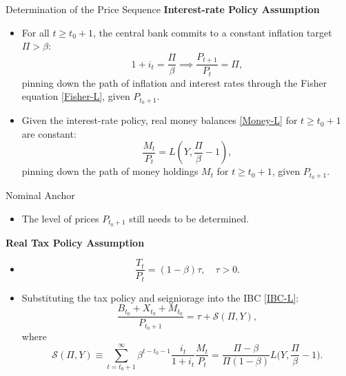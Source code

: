 \documentclass[11pt,aspectratio=169]{beamer}
\begin{document}
\begin{frame}{Determination of the Price Sequence}
\small
\textbf{Interest-rate Policy Assumption}
\begin{itemize}
    \item For all $t \ge t_0+1$, the central bank  commits to a constant inflation target $\Pi > \beta$:
    \begin{equation*}
        1+i_t = \frac{\Pi}{\beta} \implies \frac{P_{t+1}}{P_t} = \Pi,
    \end{equation*}
    pinning down the path of inflation and interest rates through the Fisher equation \eqref{Fisher-L}, given $P_{t_{0}+1}$.
    
    \item Given the interest-rate policy, real money balances \eqref{Money-L} for $t \ge t_0+1$ are constant:
    \begin{equation*}
        \frac{M_t}{P_t} = L\!\left(Y,\frac{\Pi}{\beta}-1\right),
    \end{equation*}
    pinning down the path of money holdings $M_t$ for $t \ge t_0+1$, given $P_{t_{0}+1}$.
\end{itemize}
\end{frame}

\begin{frame}{Nominal Anchor}
\small
\begin{itemize}
    \item The level of prices $P_{t_{0}+1}$ still needs to be determined.
\end{itemize}
\vspace{0.3cm}
\textbf{Real Tax Policy Assumption}
\begin{itemize}
    \item[] %
    \begin{equation*}
        \frac{T_t}{P_t} = (1-\beta)\tau, \quad \tau > 0.
    \end{equation*}
    \item Substituting the tax policy and seigniorage into the IBC \eqref{IBC-L}:
    \begin{equation*}
        \frac{B_{t_0}+X_{t_0}+M_{t_0}}{P_{t_0+1}} = \tau + \mathcal{S}(\Pi,Y),
    \end{equation*}
    where
    \begin{equation*}
\mathcal{S}(\Pi,Y) \equiv \sum_{t=t_{0}+1}^{\infty }\beta ^{t-t_{0}-1}\frac{i_{t}}{1+i_{t}}\frac{M_{t}}{P_{t}}  = \frac{\Pi-\beta}{\Pi(1-\beta)} L\Big(Y, \frac{\Pi}{\beta}-1\Big).
    \end{equation*}
\end{itemize}
\end{frame}
\end{document}
